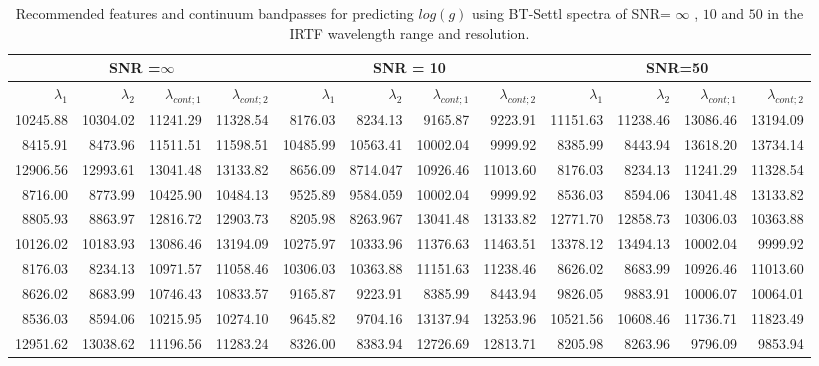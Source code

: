 \begin{table*}
\begin{center}
\begin{tabular}{rrrr | rrrr | rrrr}
  \hline
 \multicolumn{4}{c}{SNR =$ \infty$ } & \multicolumn{4}{c}{SNR = 10} &  \multicolumn{4}{c}{SNR=50} \\
  \hline
$\lambda_1$ & $\lambda_2$ & $\lambda_{cont;1}$ & $\lambda_{cont;2} $ & $\lambda_1$ & $\lambda_2$ & $\lambda_{cont;1}$ & $\lambda_{cont;2} $ & $\lambda_1$ & $\lambda_2$ & $\lambda_{cont;1}$ & $\lambda_{cont;2} $ \\ 
  \hline
     10245.88 & 10304.02 &	11241.29 & 11328.54 & 8176.03  & 8234.13  &	9165.87  & 9223.91  &  11151.63 & 11238.46 &      13086.46 & 13194.09 \\
     8415.91  & 8473.96  &	11511.51 & 11598.51 & 10485.99 & 10563.41 &	10002.04 & 9999.92  &  8385.99  & 8443.94  &      13618.20 & 13734.14 \\
     12906.56 & 12993.61 &	13041.48 & 13133.82 & 8656.09  & 8714.047 &      10926.46 & 11013.60 &  8176.03  & 8234.13  &      11241.29 & 11328.54 \\
     8716.00  & 8773.99  &	10425.90 & 10484.13 & 9525.89  & 9584.059 &	10002.04 & 9999.92  &  8536.03  & 8594.06  &      13041.48 & 13133.82 \\ 
     8805.93  & 8863.97  &	12816.72 & 12903.73 & 8205.98  & 8263.967 &	13041.48 & 13133.82 &  12771.70 & 12858.73 &      10306.03 & 10363.88 \\
     10126.02 & 10183.93 &	13086.46 & 13194.09 & 10275.97 & 10333.96 &	11376.63 & 11463.51 &  13378.12 & 13494.13 &      10002.04 & 9999.92  \\
     8176.03  & 8234.13  &	10971.57 & 11058.46 & 10306.03 & 10363.88 &	11151.63 & 11238.46 &  8626.02  & 8683.99  &      10926.46 & 11013.60 \\
     8626.02  & 8683.99  &	10746.43 & 10833.57 & 9165.87  & 9223.91  &	8385.99  & 8443.94  &  9826.05  & 9883.91  &      10006.07 & 10064.01 \\
     8536.03  & 8594.06  &	10215.95 & 10274.10 & 9645.82  & 9704.16  &	13137.94 & 13253.96 &  10521.56 & 10608.46 &      11736.71 & 11823.49 \\
     12951.62 & 13038.62 &	11196.56 & 11283.24 & 8326.00  & 8383.94  &	12726.69 & 12813.71 &  8205.98  & 8263.96  &      9796.09  & 9853.94  \\ 
   \hline
\end{tabular}
\caption {Recommended features and continuum bandpasses for predicting
  $log(g)$ using BT-Settl spectra of SNR= $\infty $ , $10$ and $50$ in the IRTF
  wavelength range and resolution.} \label{tab:irtf-logg-noisy}
\end{center}
\end{table*}


